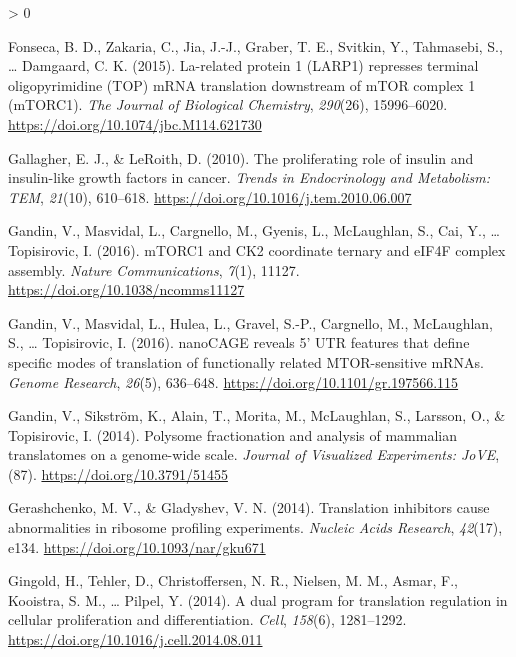 \documentclass[
  12pt,
  openany]{book}
\newlength{\cslhangindent}
\newenvironment{CSLReferences}[2] %
 {%
  \setlength{\parindent}{0pt}
  \ifodd #1 \everypar{\setlength{\hangindent}{\cslhangindent}}\ignorespaces\fi
  \ifnum #2 > 0
  \setlength{\parskip}{#2\baselineskip}
  \fi
 }%
 {}
\begin{document}
\begin{CSLReferences}{1}{0}
\leavevmode\hypertarget{ref-Fonseca2015}{}%
Fonseca, B. D., Zakaria, C., Jia, J.-J., Graber, T. E., Svitkin, Y., Tahmasebi, S., \ldots{} Damgaard, C. K. (2015). La-related protein 1 ({LARP}1) represses terminal oligopyrimidine ({TOP}) {mRNA} translation downstream of {mTOR} complex 1 ({mTORC}1). \emph{The Journal of Biological Chemistry}, \emph{290}(26), 15996--6020. \url{https://doi.org/10.1074/jbc.M114.621730}

\leavevmode\hypertarget{ref-Gallagher2010}{}%
Gallagher, E. J., \& LeRoith, D. (2010). The proliferating role of insulin and insulin-like growth factors in cancer. \emph{Trends in Endocrinology and Metabolism: {TEM}}, \emph{21}(10), 610--618. \url{https://doi.org/10.1016/j.tem.2010.06.007}

\leavevmode\hypertarget{ref-Gandin2016}{}%
Gandin, V., Masvidal, L., Cargnello, M., Gyenis, L., McLaughlan, S., Cai, Y., \ldots{} Topisirovic, I. (2016). {mTORC}1 and {CK}2 coordinate ternary and {eIF}4F complex assembly. \emph{Nature Communications}, \emph{7}(1), 11127. \url{https://doi.org/10.1038/ncomms11127}

\leavevmode\hypertarget{ref-Gandin2016a}{}%
Gandin, V., Masvidal, L., Hulea, L., Gravel, S.-P., Cargnello, M., McLaughlan, S., \ldots{} Topisirovic, I. (2016). {nanoCAGE} reveals 5' {UTR} features that define specific modes of translation of functionally related {MTOR}-sensitive {mRNAs}. \emph{Genome Research}, \emph{26}(5), 636--648. \url{https://doi.org/10.1101/gr.197566.115}

\leavevmode\hypertarget{ref-Gandin2014}{}%
Gandin, V., Sikström, K., Alain, T., Morita, M., McLaughlan, S., Larsson, O., \& Topisirovic, I. (2014). Polysome fractionation and analysis of mammalian translatomes on a genome-wide scale. \emph{Journal of Visualized Experiments: {JoVE}}, (87). \url{https://doi.org/10.3791/51455}

\leavevmode\hypertarget{ref-Gerashchenko2014}{}%
Gerashchenko, M. V., \& Gladyshev, V. N. (2014). Translation inhibitors cause abnormalities in ribosome profiling experiments. \emph{Nucleic Acids Research}, \emph{42}(17), e134. \url{https://doi.org/10.1093/nar/gku671}

\leavevmode\hypertarget{ref-Gingold2014}{}%
Gingold, H., Tehler, D., Christoffersen, N. R., Nielsen, M. M., Asmar, F., Kooistra, S. M., \ldots{} Pilpel, Y. (2014). A dual program for translation regulation in cellular proliferation and differentiation. \emph{Cell}, \emph{158}(6), 1281--1292. \url{https://doi.org/10.1016/j.cell.2014.08.011}


\end{CSLReferences}
\end{document}
